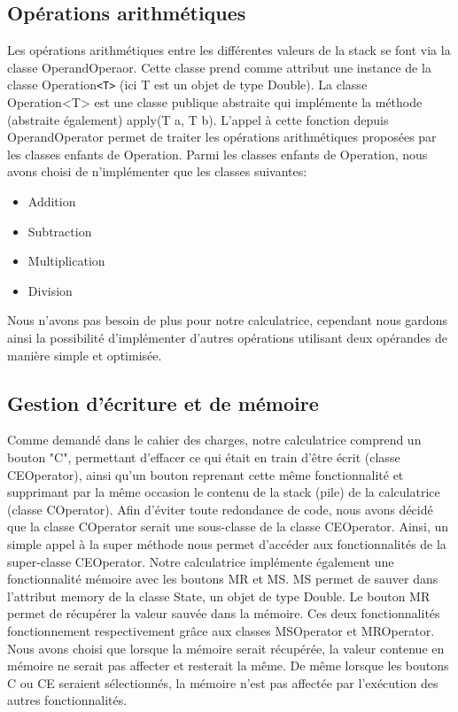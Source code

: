 \documentclass[12pt]{report}
\begin{document}
        \subsection*{Opérations arithmétiques}
            Les opérations arithmétiques entre les différentes valeurs de la stack se font via la classe OperandOperaor.
    \newline Cette classe prend comme attribut une instance de la classe Operation\verb|<T>| (ici T est un objet de type Double).
    La classe Operation<T> est une classe publique abstraite qui implémente la méthode (abstraite également) apply(T a, T b).
    L'appel à cette fonction depuis OperandOperator permet de traiter les opérations arithmétiques proposées par les classes
    enfants de Operation.
    \newline Parmi les classes enfants de Operation, nous avons choisi de n'implémenter que les classes suivantes:
    \begin{itemize}
        \item Addition
        \item Subtraction
        \item Multiplication
        \item Division
    \end{itemize}
    Nous n'avons pas besoin de plus pour notre calculatrice, cependant nous gardons ainsi la possibilité d'implémenter d'autres
    opérations utilisant deux opérandes de manière simple et optimisée.

        \subsection*{Gestion d'écriture et de mémoire}
            Comme demandé dans le cahier des charges, notre calculatrice comprend un bouton "C", permettant d'effacer ce qui était
    en train d'être écrit (classe CEOperator), ainsi qu'un bouton reprenant cette même fonctionnalité et supprimant par la même occasion le
    contenu de la stack (pile) de la calculatrice (classe COperator). Afin d'éviter toute redondance de code, nous avons décidé que
    la classe COperator serait une sous-classe de la classe CEOperator. Ainsi, un simple appel à la super méthode nous permet
    d'accéder aux fonctionnalités de la super-classe CEOperator.
    \newline Notre calculatrice implémente également une fonctionnalité mémoire avec les boutons MR et MS. MS permet de
    sauver dans l'attribut memory de la classe State, un objet de type Double. Le bouton MR permet de récupérer la valeur
    sauvée dans la mémoire. Ces deux fonctionnalités fonctionnement respectivement grâce aux classes MSOperator et MROperator.
    \newline Nous avons choisi que lorsque la mémoire serait récupérée, la valeur contenue en mémoire ne serait pas affecter et resterait
    la même. De même lorsque les boutons C ou CE seraient sélectionnés, la mémoire n'est pas affectée par l'exécution des autres
    fonctionnalités.
\end{document}
